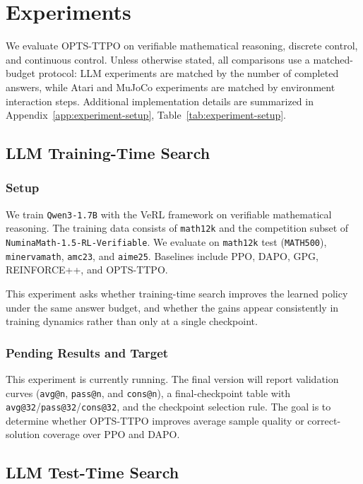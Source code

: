 \section{Experiments}
\label{sec:experiments}

We evaluate OPTS-TTPO on verifiable mathematical reasoning, discrete control, and continuous control. Unless otherwise stated, all comparisons use a matched-budget protocol: LLM experiments are matched by the number of completed answers, while Atari and MuJoCo experiments are matched by environment interaction steps. Additional implementation details are summarized in Appendix~\ref{app:experiment-setup}, Table~\ref{tab:experiment-setup}.

\subsection{LLM Training-Time Search}
\label{sec:llm-train-search}

\subsubsection{Setup}

We train \texttt{Qwen3-1.7B} with the VeRL framework on verifiable mathematical reasoning. The training data consists of \texttt{math12k} and the competition subset of \texttt{NuminaMath-1.5-RL-Verifiable}. We evaluate on \texttt{math12k} test (\texttt{MATH500}), \texttt{minervamath}, \texttt{amc23}, and \texttt{aime25}. Baselines include PPO, DAPO, GPG, REINFORCE++, and OPTS-TTPO.

This experiment asks whether training-time search improves the learned policy under the same answer budget, and whether the gains appear consistently in training dynamics rather than only at a single checkpoint.

\subsubsection{Pending Results and Target}

This experiment is currently running. The final version will report validation curves (\texttt{avg@n}, \texttt{pass@n}, and \texttt{cons@n}), a final-checkpoint table with \texttt{avg@32}/\texttt{pass@32}/\texttt{cons@32}, and the checkpoint selection rule. The goal is to determine whether OPTS-TTPO improves average sample quality or correct-solution coverage over PPO and DAPO.

\subsection{LLM Test-Time Search}
\label{sec:llm-test-search}

